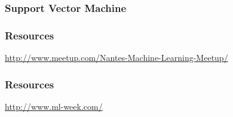 \begin{frame}[t]
  \frametitle{Support Vector Machine}
  \vspace{1cm}
\centerline{}
\end{frame}

\begin{frame}
  
\end{frame}

\begin{frame}
  
\end{frame}

\begin{frame}
  
\end{frame}


\begin{frame}
  \frametitle{Resources}

  \vspace{5mm}
  \centerline{\url{http://www.meetup.com/Nantes-Machine-Learning-Meetup/}}
\end{frame}

\begin{frame}
  \frametitle{Resources}

  \vspace{5mm}
  \centerline{\url{http://www.ml-week.com/}}
\end{frame}

\begin{frame}
\end{frame}


